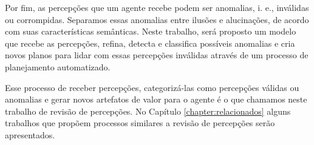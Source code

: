 Por fim, as percepções que um agente recebe podem ser anomalias, i. e., inválidas ou corrompidas. Separamos essas anomalias entre ilusões e alucinações, de acordo com suas características semânticas. Neste trabalho, será proposto um modelo que recebe as percepções, refina, detecta e classifica possíveis anomalias e cria novos planos para lidar com essas percepções inválidas através de um processo de planejamento automatizado.

Esse processo de receber percepções, categorizá-las como percepções válidas ou anomalias e gerar novos artefatos de valor para o agente é o que chamamos neste trabalho de revisão de percepções. No Capítulo \ref{chapter:relacionados} alguns trabalhos que propõem processos similares a revisão de percepções serão apresentados.